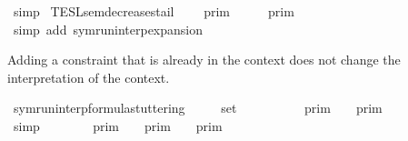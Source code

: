 \begin{isabellebody}
%
\isadelimproof
%
\endisadelimproof
%
\isatagproof
{}\isamarkupfalse%
\ simp%
\endisatagproof
{\isafoldproof}%
%
\isadelimproof
\isanewline
%
\endisadelimproof
\isanewline
{}\isamarkupfalse%
\ TESL{\isacharunderscore}sem{\isacharunderscore}decreases{\isacharunderscore}tail{\isacharcolon}\isanewline
\ \ {\isacartoucheopen}{\isasymlbrakk}{\isasymlbrakk}\ {\isasymGamma}\ {\isasymrbrakk}{\isasymrbrakk}\isactrlsub p\isactrlsub r\isactrlsub i\isactrlsub m\ {\isasymsupseteq}\ {\isasymlbrakk}{\isasymlbrakk}\ {\isasymGamma}\ {\isacharat}\ {\isacharbrackleft}{\isasymgamma}{\isacharbrackright}\ {\isasymrbrakk}{\isasymrbrakk}\isactrlsub p\isactrlsub r\isactrlsub i\isactrlsub m{\isacartoucheclose}\isanewline
%
\isadelimproof
%
\endisadelimproof
%
\isatagproof
{}\isamarkupfalse%
\ {\isacharparenleft}simp\ add{\isacharcolon}\ symrun{\isacharunderscore}interp{\isacharunderscore}expansion{\isacharparenright}%
\endisatagproof
{\isafoldproof}%
%
\isadelimproof
%
\endisadelimproof
%
\begin{isamarkuptext}%
Adding a constraint that is already in the context does not change the
  interpretation of the context.%
\end{isamarkuptext}\isamarkuptrue%
\isamarkupfalse%
\ symrun{\isacharunderscore}interp{\isacharunderscore}formula{\isacharunderscore}stuttering{\isacharcolon}\isanewline
\ \ \ {\isacartoucheopen}{\isasymgamma}\ {\isasymin}\ set\ {\isasymGamma}{\isacartoucheclose}\isanewline
\ \ \ \ \ {\isacartoucheopen}{\isasymlbrakk}{\isasymlbrakk}\ {\isasymgamma}\ {\isacharhash}\ {\isasymGamma}\ {\isasymrbrakk}{\isasymrbrakk}\isactrlsub p\isactrlsub r\isactrlsub i\isactrlsub m\ {\isacharequal}\ {\isasymlbrakk}{\isasymlbrakk}\ {\isasymGamma}\ {\isasymrbrakk}{\isasymrbrakk}\isactrlsub p\isactrlsub r\isactrlsub i\isactrlsub m{\isacartoucheclose}\isanewline
%
\isadelimproof
%
\endisadelimproof
%
\isatagproof
{}\isamarkupfalse%
\ {\isacharminus}\isanewline
\ \ \isamarkupfalse%
\ {\isacartoucheopen}{\isasymgamma}\ {\isacharhash}\ {\isasymGamma}\ {\isacharequal}\ {\isacharbrackleft}{\isasymgamma}{\isacharbrackright}\ {\isacharat}\ {\isasymGamma}{\isacartoucheclose}\ \isamarkupfalse%
\ simp\isanewline
\ \ \isamarkupfalse%
\ {\isacartoucheopen}{\isasymlbrakk}{\isasymlbrakk}\ {\isasymgamma}\ {\isacharhash}\ {\isasymGamma}\ {\isasymrbrakk}{\isasymrbrakk}\isactrlsub p\isactrlsub r\isactrlsub i\isactrlsub m\ {\isacharequal}\ {\isasymlbrakk}{\isasymlbrakk}\ {\isacharbrackleft}{\isasymgamma}{\isacharbrackright}\ {\isasymrbrakk}{\isasymrbrakk}\isactrlsub p\isactrlsub r\isactrlsub i\isactrlsub m\ {\isasyminter}\ {\isasymlbrakk}{\isasymlbrakk}\ {\isasymGamma}\ {\isasymrbrakk}{\isasymrbrakk}\isactrlsub p\isactrlsub r\isactrlsub i\isactrlsub m{\isacartoucheclose}\isanewline

\end{isabellebody}

